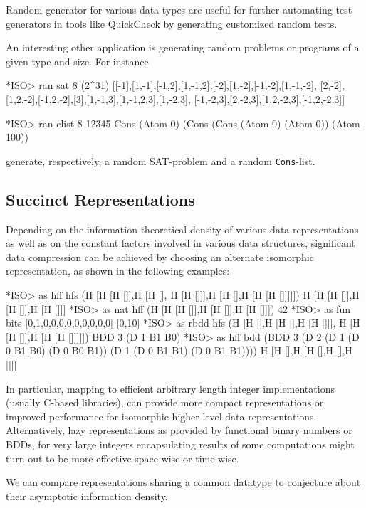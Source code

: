 \documentclass[]{INCLUDES/llncs}
\begin{document}
Random generator for various data types are useful for further automating
test generators in tools like QuickCheck 
\cite{DBLP:journals/sigplan/ClaessenH02}
by generating customized random tests.

An interesting other application is generating random problems or programs of a
given type and size.
For instance
\begin{codex}
*ISO> ran sat 8 (2^31)
[[-1],[1,-1],[-1,2],[1,-1,2],[-2],[1,-2],[-1,-2],[1,-1,-2],
[2,-2],[1,2,-2],[-1,2,-2],[3],[1,-1,3],[1,-1,2,3],[1,-2,3],
[-1,-2,3],[2,-2,3],[1,2,-2,3],[-1,2,-2,3]]
 
*ISO> ran clist 8 12345
Cons (Atom 0) (Cons (Cons (Atom 0) (Atom 0)) (Atom 100))
\end{codex}
generate, respectively, a random SAT-problem and a random {\tt Cons}-list.

\subsection{Succinct Representations}
Depending on the information theoretical density of
various data representations as well as on the
constant factors involved in various data structures,
significant data compression can be achieved by
choosing an alternate isomorphic representation,
as shown in the following examples:

\begin{codex}
*ISO> as hff hfs (H [H [H []],H [H [],
        H [H []]],H [H [],H [H [H []]]]])
H [H [H []],H [H []],H [H []]]
*ISO> as nat hff (H [H [H []],H [H []],H [H []]])
42
*ISO> as fun bits [0,1,0,0,0,0,0,0,0,0,0]
[0,10]
*ISO> as rbdd hfs (H [H [],H [H [],H [H []]],
                      H [H [H []],H [H [H []]]]])
BDD 3 (D 1 B1 B0)
*ISO> as hff bdd (BDD 3 (D 2 
        (D 1 (D 0 B1 B0) (D 0 B0 B1)) 
        (D 1 (D 0 B1 B1) (D 0 B1 B1))))
H [H [],H [H [],H [],H []]]

\end{codex}

In particular, mapping to efficient arbitrary length
integer implementations (usually C-based
libraries), can provide more compact
representations or improved performance
for isomorphic higher level 
data representations. Alternatively,
lazy representations as provided by
functional binary numbers or BDDs,
for very large
integers encapsulating results of some
computations might turn out to be more
effective space-wise or time-wise.

We can compare representations sharing
a common datatype to conjecture about their
asymptotic information density.
\end{document}
